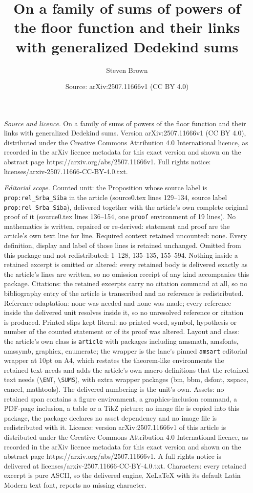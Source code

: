 \documentclass[10pt,a4paper]{amsart}
\title[On a family of sums of powers of the floor function and thei]{On a family of sums of powers of the floor function and their links with generalized Dedekind sums}
\author{Steven Brown}
\date{Source: arXiv:2507.11666v1 (CC BY 4.0)}
\begin{document}
\maketitle

\noindent\emph{Source and licence.} On a family of sums of powers of the floor function and their links with generalized Dedekind sums. Version arXiv:2507.11666v1 (CC BY 4.0), distributed under the Creative Commons Attribution 4.0 International licence, as recorded in the arXiv licence metadata for this exact version and shown on the abstract page https://arxiv.org/abs/2507.11666v1. Full rights notice: licenses/arxiv-2507.11666-CC-BY-4.0.txt.\par\smallskip

\noindent\textit{Editorial scope.} Counted unit: the Proposition whose source label is \texttt{prop:rel\_Srba\_Siba} in the article (source0.tex lines 129--134, source label \texttt{prop:rel\_Srba\_Siba}), delivered together with the article's own complete original proof of it (source0.tex lines 136--154, one \texttt{proof} environment of 19 lines). No mathematics is written, repaired or re-derived: statement and proof are the article's own text line for line. Required context retained uncounted: none. Every definition, display and label of those lines is retained unchanged. Omitted from this package and not redistributed: 1--128, 135--135, 155--594. Nothing inside a retained excerpt is omitted or altered: every retained body is delivered exactly as the article's lines are written, so no omission receipt of any kind accompanies this package. Citations: the retained excerpts carry no citation command at all, so no bibliography entry of the article is transcribed and no reference is redistributed. Reference adaptation: none was needed and none was made; every reference inside the delivered unit resolves inside it, so no unresolved reference or citation is produced. Printed slips kept literal: no printed word, symbol, hypothesis or number of the counted statement or of its proof was altered. Layout and class: the article's own class is \texttt{article} with packages including amsmath, amsfonts, amssymb, graphicx, enumerate; the wrapper is the lane's pinned \texttt{amsart} editorial wrapper at 10pt on A4, which restates the theorem-like environments the retained text needs and adds the article's own macro definitions that the retained text needs (\texttt{\textbackslash ENT}, \texttt{\textbackslash SUMS}), with extra wrapper packages (bm, bbm, dsfont, xspace, cancel, mathtools). The delivered numbering is the unit's own. Assets: no retained span contains a figure environment, a graphics-inclusion command, a PDF-page inclusion, a table or a TikZ picture; no image file is copied into this package, the package declares no asset dependency and no image file is redistributed with it. Licence: version arXiv:2507.11666v1 of this article is distributed under the Creative Commons Attribution 4.0 International licence, as recorded in the arXiv licence metadata for this exact version and shown on the abstract page https://arxiv.org/abs/2507.11666v1. A full rights notice is delivered at licenses/arxiv-2507.11666-CC-BY-4.0.txt. Characters: every retained excerpt is pure ASCII, so the delivered engine, XeLaTeX with its default Latin Modern text font, reports no missing character.
\end{document}
